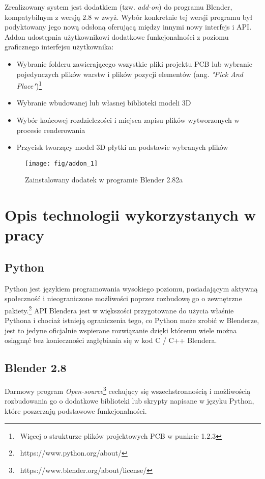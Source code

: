 \documentclass[brudnopis]{xmgr}
\begin{document}
Zrealizowany system jest dodatkiem (tzw. \emph{add-on}) do programu Blender, kompatybilnym z wersją 2.8 w zwyż. Wybór konkretnie tej wersji programu był podyktowany jego nową odsłoną oferującą między innymi nowy interfejs i API. Addon udostępnia użytkownikowi dodatkowe funkcjonalności z poziomu graficznego interfejsu użytkownika:
\begin{itemize}
\item Wybranie folderu zawierającego wszystkie pliki projektu PCB lub wybranie pojedynczych plików warstw i  plików pozycji elementów (ang. \emph{"Pick And Place"})\footnote{~Więcej o strukturze plików projektowych PCB w punkcie 1.2.3}
\item Wybranie wbudowanej lub własnej biblioteki modeli 3D
\item Wybór końcowej rozdzielczości i miejsca zapisu plików wytworzonych w procesie renderowania
\item Przycisk tworzący model 3D płytki na podstawie wybranych plików
\end{itemize}

\begin{figure}
\centering
\texttt{[image: fig/addon\_1]}
\caption{Zainstalowany dodatek w programie Blender 2.82a\label{RYS.2}}
\end{figure}

\section {Opis technologii wykorzystanych w pracy}

\subsection{Python}
Python jest językiem programowania wysokiego poziomu, posiadającym aktywną społeczność i nieograniczone możliwości poprzez rozbudowę go o zewnętrzne pakiety.\footnote {~https://www.python.org/about/} API Blendera jest w większości przygotowane do użycia właśnie Pythona i chociaż istnieją ograniczenia tego, co Python może zrobić w Blenderze, jest to jedyne oficjalnie wspierane rozwiązanie dzięki któremu wiele można osiągnąć bez konieczności zagłębiania się w kod C / C++ Blendera.

\subsection {Blender 2.8}
Darmowy program \emph{Open-source}\footnote{~https://www.blender.org/about/license/} cechujący się wszechstronnością i możliwością rozbudowania go o dodatkowe biblioteki lub skrypty napisane w języku Python, które poszerzają podstawowe funkcjonalności.
\end{document}
